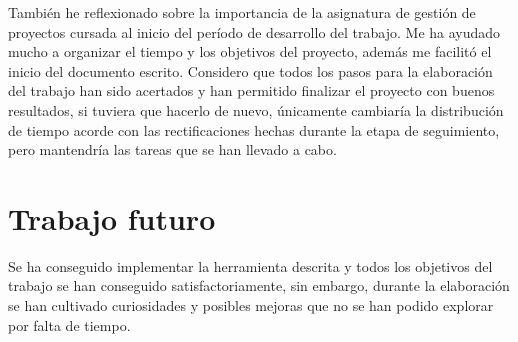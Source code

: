 También he reflexionado sobre la importancia de la asignatura de gestión de proyectos cursada al inicio del período de desarrollo del trabajo. Me ha ayudado mucho a organizar el tiempo y los objetivos del proyecto, además me facilitó el inicio del documento escrito.
Considero que todos los pasos para la elaboración del trabajo han sido acertados y han permitido finalizar el proyecto con buenos resultados, si tuviera que hacerlo de nuevo, únicamente cambiaría la distribución de tiempo acorde con las rectificaciones hechas durante la etapa de seguimiento, pero mantendría las tareas que se han llevado a cabo.

\section{Trabajo futuro}
Se ha conseguido implementar la herramienta descrita y todos los objetivos del trabajo se han conseguido satisfactoriamente, sin embargo, durante la elaboración se han cultivado curiosidades y posibles mejoras que no se han podido explorar por falta de tiempo.
